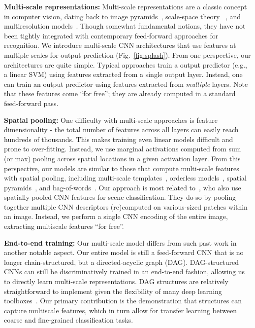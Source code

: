 \documentclass[10pt,twocolumn,letterpaper]{article}
\begin{document}
{\bf Multi-scale representations:}  Multi-scale representations are a classic concept in computer vision, dating back to image pyramids~\cite{burt1983laplacian}, scale-space theory ~\cite{lindeberg1993scale}, and multiresolution models~\cite{mallat1999wavelet}. Though somewhat fundamental notions, they have not been tightly integrated with contemporary feed-forward approaches for recognition. We introduce multi-scale CNN architectures that use features at multiple scales for output prediction (Fig.~\ref{fig:splash}). From one perspective, our architectures are quite simple. Typical approaches train a output predictor (e.g., a linear SVM) using features extracted from a single output layer. Instead, one can train an output predictor using features extracted from {\em multiple} layers. Note that these features come ``for free''; they are already computed in a standard feed-forward pass.

{\bf Spatial pooling:} One difficulty with multi-scale approaches is feature dimensionality - the total number of features across all layers can easily reach hundreds of thousands. This makes training even linear models difficult and prone to over-fitting. Instead, we use marginal activations computed from sum (or max) pooling across spatial locations in a given activation layer. From this perspective, our models are similar to those that compute multi-scale features with spatial pooling, including multi-scale templates~\cite{felzenszwalb2008discriminatively}, orderless models~\cite{Gong14}, spatial pyramids~\cite{spatial_pyramid}, and bag-of-words~\cite{sivic2003video}. Our approach is most related to~\cite{Gong14}, who also use spatially pooled CNN features for scene classification. They do so by pooling together multiple CNN descriptors (re)computed on various-sized patches within an image. Instead, we perform a single CNN encoding of the entire image, extracting multiscale features ``for free''.

{\bf End-to-end training:} Our multi-scale model differs from such past work in another notable aspect. Our entire model is still a feed-forward CNN that is no longer chain-structured, but a directed-acyclic graph (DAG). DAG-structured CNNs can still be discriminatively trained in an end-to-end fashion, allowing us to directly learn multi-scale representations. %
DAG structures are relatively straightforward to implement given the flexibility of many deep learning toolboxes~\cite{vedaldimatconvnet,Caffe}. Our primary contribution is the demonstration that structures can capture multiscale features, which in turn allow for transfer learning between coarse and fine-grained classification tasks.
\end{document}
